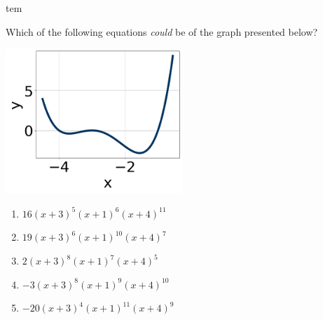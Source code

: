 \documentclass[14pt]{extbook}
\begin{document}
\begin{enumerate}
tem{
Which of the following equations \textit{could} be of the graph presented below?
\begin{center}
    \includegraphics[width=0.5\textwidth]{../Figures/polyGraphToFunctionB.png}
\end{center}
\begin{enumerate}[label=\Alph*.]
\item \( 16(x + 3)^{5} (x + 1)^{6} (x + 4)^{11} \)
\item \( 19(x + 3)^{6} (x + 1)^{10} (x + 4)^{7} \)
\item \( 2(x + 3)^{8} (x + 1)^{7} (x + 4)^{5} \)
\item \( -3(x + 3)^{8} (x + 1)^{9} (x + 4)^{10} \)
\item \( -20(x + 3)^{4} (x + 1)^{11} (x + 4)^{9} \)


\end{enumerate}}
\end{enumerate}
\end{document}
